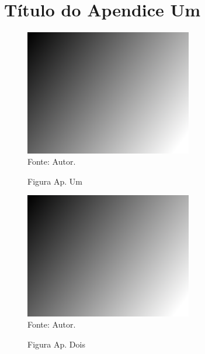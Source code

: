 \chapter{Título do Apendice Um}
\label{ap:TituloDoApendiceUm}

\lipsum[1-3]

\begin{figure}[!htb]
	\centering 
	\caption{Figura Ap. Um}
	\includegraphics[width=0.65\textwidth,keepaspectratio]{imagens/img.png} 
	\label{fig:Ap_um}
	\\
	\footnotesize{Fonte: Autor.}
\end{figure}
\lipsum[1-3]

\begin{figure}[!htb]
	\centering 
	\caption{Figura Ap. Dois}
	\includegraphics[width=0.65\textwidth,keepaspectratio]{imagens/img.png} 
	\label{fig:Ap_dois}
	\\
	\footnotesize{Fonte: Autor.}
\end{figure}
\lipsum[1-3]